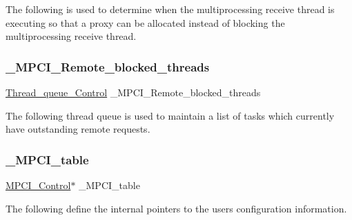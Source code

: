The following is used to determine when the multiprocessing receive thread is executing so that a proxy can be allocated instead of blocking the multiprocessing receive thread. \mbox{\label{group__RTEMSScoreMPCI_gab1454472037213316f1ba2a85c29820b}} 
\subsubsection{\texorpdfstring{\_MPCI\_Remote\_blocked\_threads}{\_MPCI\_Remote\_blocked\_threads}}
{\footnotesize\ttfamily \mbox{\hyperlink{structThread__queue__Control}{Thread\+\_\+queue\+\_\+\+Control}} \+\_\+\+M\+P\+C\+I\+\_\+\+Remote\+\_\+blocked\+\_\+threads}

The following thread queue is used to maintain a list of tasks which currently have outstanding remote requests. \mbox{\label{group__RTEMSScoreMPCI_ga6b0a65f9ac68015c46d17f17f44a5bd9}} 
\subsubsection{\texorpdfstring{\_MPCI\_table}{\_MPCI\_table}}
{\footnotesize\ttfamily \mbox{\hyperlink{structMPCI__Control}{M\+P\+C\+I\+\_\+\+Control}}$\ast$ \+\_\+\+M\+P\+C\+I\+\_\+table}

The following define the internal pointers to the user\textquotesingle{}s configuration information. 
